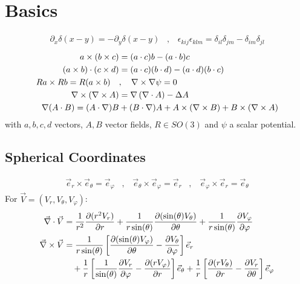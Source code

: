 \section{Basics}

\begin{align*}
    \partial_x \delta(x-y) = - \partial_y \delta(x-y)
    \hspace{10pt} , \hspace{10pt}
    \epsilon_{kij} \epsilon_{klm} = \delta_{il} \delta_{jm} - \delta_{im} \delta_{jl}
\end{align*}
\begin{align*}
    a \times (b \times c) &= (a \cdot c) b - (a \cdot b) c
    \\
    (a \times b) \cdot (c \times d) &= (a \cdot c) (b \cdot d) - (a \cdot d) (b \cdot c)
    \\
    R a \times R b = R (a \times b)
    \hspace{10pt} &, \hspace{10pt}
    \nabla \times \nabla \psi = 0
    \\
    \nabla \times (\nabla \times A) &= \nabla \left( \nabla \cdot A \right) - \Delta A
    \\
    \nabla (A \cdot B) = (A \cdot \nabla) B &+ (B \cdot \nabla) A + A \times (\nabla \times B) + B \times (\nabla \times A)
\end{align*}
with $a,b,c,d$ vectors, $A,B$ vector fields, $R \in SO(3)$ and $\psi$ a
scalar potential.

\subsection{Spherical Coordinates}
\begin{align*}
    \vec{e}_r \times \vec{e}_\theta = \vec{e}_\varphi
    \hspace{10pt} , \hspace{10pt}
    \vec{e}_\theta \times \vec{e}_\varphi = \vec{e}_r
    \hspace{10pt} , \hspace{10pt}
    \vec{e}_\varphi \times \vec{e}_r = \vec{e}_\theta
\end{align*}
For $\vec{V} = (V_r,V_\theta,V_\varphi)$:
\begin{align*}
    \vec{\nabla} \cdot \vec{V} &=
    \frac{1}{r^2} \frac{\partial (r^2 V_r)}{\partial r}
        + \frac{1}{r \sin(\theta)} \frac{\partial (\sin(\theta) V_\theta)}{\partial \theta}
        + \frac{1}{r \sin(\theta)} \frac{\partial V_\varphi}{\partial \varphi}
    \\
    \vec{\nabla} \times \vec{V} &=
    \frac{1}{r \sin(\theta)} \left[ \frac{\partial (\sin(\theta) V_\varphi)}{\partial \theta} - \frac{\partial V_\theta}{\partial \varphi} \right] \vec{e}_r
    \\
        &\hspace{10pt} + \frac{1}{r} \left[ \frac{1}{\sin(\theta)} \frac{\partial V_r}{\partial \varphi} - \frac{\partial(r V_\varphi)}{\partial r} \right] \vec{e}_{\theta}
        + \frac{1}{r} \left[ \frac{\partial(r V_\theta)}{\partial r} - \frac{\partial V_r}{\partial \theta} \right] \vec{e}_\varphi
\end{align*}

